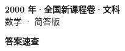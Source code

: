 \documentclass[zihao=-4, a4paper]{ctexart}
\begin{document}
\begin{center}
  {\Large\bfseries 2000 年·全国新课程卷·文科}\\[4pt]
  {\large 数学 · 简答版}
\end{center}
\medskip
{}

\clearpage
{}
\begin{center}{\Large\bfseries 答案速查}\end{center}
\medskip

\end{document}

